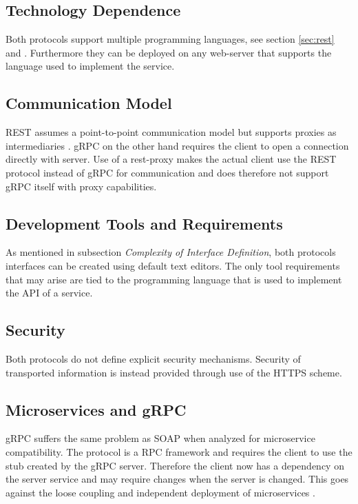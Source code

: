 \documentclass[conference]{IEEEtran}
\begin{document}
\subsection{Technology Dependence}

Both protocols support multiple programming languages, see section \ref{sec:rest} and \cite{grpcmotiviation}. Furthermore they can be deployed on any web-server that supports the language used to implement the service.

\subsection{Communication Model}

REST assumes a point-to-point communication model but supports proxies as intermediaries \cite{wagh2012comparative}. gRPC on the other hand requires the client to open a connection directly with server. Use of a rest-proxy makes the actual client use the REST protocol instead of gRPC for communication and does therefore not support gRPC itself with proxy capabilities.

\subsection{Development Tools and Requirements}

As mentioned in subsection \textit{Complexity of Interface Definition}, both protocols interfaces can be created using default text editors. The only tool requirements that may arise are tied to the programming language that is used to implement the API of a service.

\subsection{Security}

Both protocols do not define explicit security mechanisms. Security of transported information is instead provided through use of the HTTPS scheme.

\subsection{Microservices and gRPC}
\label{sec:mgrpc}

gRPC suffers the same problem as SOAP when analyzed for microservice compatibility. The protocol is a RPC framework and requires the client to use the stub created by the gRPC server. Therefore the client now has a dependency on the server service and may require changes when the server is changed. This goes against the loose coupling and independent deployment of microservices \cite{karmel2016nist}.
\end{document}
